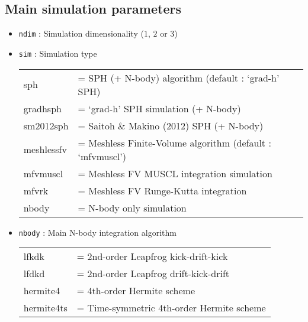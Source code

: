 \documentclass[a4paper]{article}
\newcommand{\var}[1]{\texttt{#1}}
\begin{document}
\subsection{Main simulation parameters}

\begin{itemize}

\item \var{ndim} : Simulation dimensionality ($1$, $2$ or $3$)

\item \var{sim} : Simulation type \vspace{0.1cm} \\
\begin{tabular}{ll}
sph               & = SPH (+ N-body) algorithm (default : `grad-h' SPH) \\
gradhsph          & = `grad-h' SPH simulation (+ N-body) \\
sm2012sph         & = Saitoh \& Makino (2012) SPH (+ N-body) \\
meshlessfv        & = Meshless Finite-Volume algorithm (default : `mfvmuscl') \\
mfvmuscl          & = Meshless FV MUSCL integration simulation \\
mfvrk             & = Meshless FV Runge-Kutta integration \\
nbody             & = N-body only simulation
\end{tabular}

\item \var{nbody} : Main N-body integration algorithm \\
\begin{tabular}{ll}
lfkdk        & = 2nd-order Leapfrog kick-drift-kick \\
lfdkd        & = 2nd-order Leapfrog drift-kick-drift \\
hermite4     & = 4th-order Hermite scheme \\
hermite4ts   & = Time-symmetric 4th-order Hermite scheme
\end{tabular}


\end{itemize}
\end{document}
